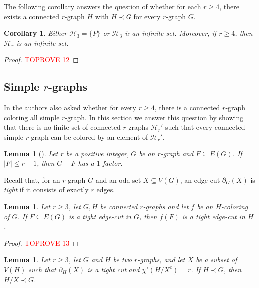 \documentclass[a4paper,11pt]{article}
\newcommand{\ca}{\mathcal}
\newtheorem{lem}[defi]{Lemma}
\newtheorem{cor}[defi]{Corollary}
\theoremstyle{remark}
\begin{document}
The following corollary answers the question of 
\cite{MTZ_r_graphs} whether for each $r \geq 4$, there exists a
connected $r$-graph $H$ with $H \prec G$ for every $r$-graph $G$.

\begin{cor}
	\label{cor:H_3 = P or infinite}
	Either $\ca H_3 = \{P\}$ or $\ca H_3$ is an infinite set.	
	Moreover, if $r\geq 4$, then $\ca H_r$ is an infinite set.
\end{cor}

\begin{proof}\textcolor{red}{TOPROVE 12}\end{proof}








\subsection{Simple $r$-graphs}

In \cite{MTZ_r_graphs} the authors also asked whether for every $r\geq 4$, there is a connected $r$-graph coloring all simple $r$-graph. In this section we answer this question by showing that there is no finite set of connected $r$-graphs $\ca H_r'$ such that every connected simple $r$-graph can be colored by an element of $\ca H_r'$. 


\begin{lem}[\cite{jin2017covers}]\label{lem:1-fator_avoiding_r-1_edges}
	Let $r$ be a positive integer, $G$ be an $r$-graph and $F \subseteq E(G)$. 
	If $|F|\le r-1$, then $G-F$ has a $1$-factor.
\end{lem}

Recall that, for an $r$-graph $G$ and an odd set $X\subseteq V(G)$, an edge-cut $\partial_G(X)$ is \emph{tight} if it consists of exactly $r$ edges. 

\begin{lem}\label{Proposition-tightcut-to-tightcut}
	Let $r\geq3$, let $G,H$ be connected $r$-graphs and let $f$ be an $H$-coloring of $G$. If $F\subseteq E(G)$ is a tight edge-cut in $G$, then $f(F)$ is a tight edge-cut in $H$.
\end{lem}

\begin{proof}\textcolor{red}{TOPROVE 13}\end{proof}



\begin{lem}\label{Lemma-H-noclass1-subgraph}
	Let $r \geq 3$, let $ G $ and $ H $ be two $ r $-graphs, and let $ X $ be a subset of $ V(H) $ such that $ \partial_H(X) $ is a tight cut and $ \chi'(H/X^c)= r$. If  $H\prec G $,  then $H/X \prec G $.
\end{lem}
\end{document}
